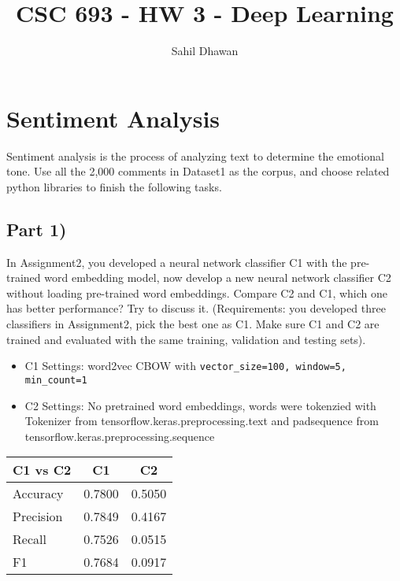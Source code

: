 \documentclass[conference]{IEEEtran}
\begin{document}
\onecolumn
\title{CSC 693 - HW 3 - Deep Learning}
\author{Sahil Dhawan}
\maketitle
\section{Sentiment Analysis}
\par \noindent Sentiment analysis is the process of analyzing text to determine the emotional tone. Use all the 2,000 comments in Dataset1 as the corpus, and choose related python libraries to finish the following tasks.

\subsection{Part 1)}
\par \noindent In Assignment2, you developed a neural network classifier C1 with the pre-trained word embedding model, now develop a new neural network classifier C2 without loading pre-trained word embeddings. Compare C2 and C1, which one has better performance? Try to discuss it. (Requirements: you developed three classifiers in Assignment2, pick the best one as C1. Make sure C1 and C2 are trained and evaluated with the same training, validation and testing sets).\\

\begin{itemize}
\item C1 Settings: word2vec CBOW with \verb"vector_size=100, window=5, min_count=1"
\item C2 Settings: No pretrained word embeddings, words were tokenzied with Tokenizer from tensorflow.keras.preprocessing.text and pad\textunderscore sequence from tensorflow.keras.preprocessing.sequence
\end{itemize}

\begin{table}[H]
    \centering
    \begin{tabular}{|l|c|c|}
        \hline
        C1 vs C2 & C1 & C2 \\
        \hline
        Accuracy  & 0.7800 & 0.5050 \\
        Precision & 0.7849 & 0.4167 \\
        Recall    & 0.7526 & 0.0515 \\
        F1        & 0.7684 & 0.0917 \\
        \hline
    \end{tabular}
\end{table}
\end{document}
